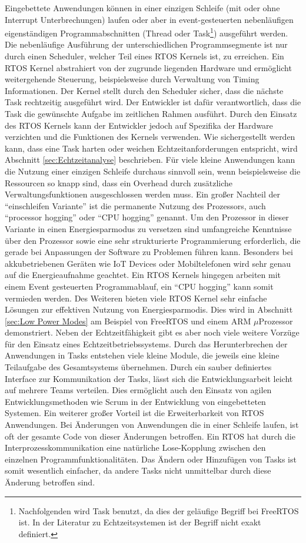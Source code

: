 Eingebettete Anwendungen können in einer einzigen Schleife (mit oder ohne Interrupt Unterbrechungen) laufen oder aber in event-gesteuerten ne\-ben\-läuf\-igen ei\-gen\-stän\-dig\-en Pro\-gramm\-ab\-schnit\-ten (Thre\-ad oder Task\footnote{Nachfolgenden wird Task benutzt, da dies der geläufige Begriff bei FreeRTOS ist. In der Literatur zu Echtzeitsystemen ist der Begriff nicht exakt definiert.}) ausgeführt werden. Die ne\-ben\-läuf\-ige Aus\-füh\-rung der unterschiedlichen Programmsegmente ist nur durch einen Scheduler, welcher Teil eines RTOS Kernels ist, zu erreichen. Ein RTOS Kernel abstrahiert von der zugrunde liegenden Hardware und ermöglicht weitergehende Steuerung, beispielsweise durch Verwaltung von Timing Informationen. Der Kernel stellt durch den Scheduler sicher, dass die näch\-ste Task rechtzeitig ausgeführt wird. Der Entwickler ist dafür verantwortlich, dass die Task die ge\-wün\-schte Aufgabe im zeitlichen Rahmen ausführt. Durch den Einsatz des RTOS Kernels kann der Entwickler jedoch auf Spezifika der Hardware verzichten und die Funktionen des Kernels verwenden. Wie sichergestellt werden kann, dass eine Task harten oder weichen Echtzeitanforderungen entspricht, wird Abschnitt \ref{sec:Echtzeitanalyse} beschrieben. Für viele kleine Anwendungen kann die Nutzung einer einzigen Schleife durchaus sinnvoll sein, wenn beispielsweise die Ressourcen so knapp sind, dass ein Overhead durch zusätzliche Verwaltungsfunktionen ausgeschlossen werden muss. Ein großer Nachteil der "`einschleifen Variante"' ist die permanente Nutzung des Prozessors, auch "`processor hogging"' oder "`CPU hogging"' genannt. Um den Prozessor in dieser Variante in einen Energiesparmodus zu versetzen sind umfangreiche Kenntnisse über den Prozessor sowie eine sehr strukturierte Programmierung erforderlich, die gerade bei Anpassungen der Software zu Problemen führen kann. Besonders bei akkubetriebenen Geräten wie IoT Devices oder Mobiltelefonen wird sehr genau auf die Energieaufnahme geachtet. Ein RTOS Kernels hingegen arbeiten mit einem Event gesteuerten Programmablauf, ein "`CPU hogging"' kann somit vermieden werden. Des Weiteren bieten viele RTOS Kernel sehr einfache Lösungen zur effektiven Nutzung von Energiesparmodis. Dies wird in Abschnitt \ref{sec:Low Power Modes} am Beispiel von FreeRTOS und einem ARM $\mu$Prozessor demonstriert. Neben der Echt\-zeit\-fähig\-keit gibt es aber noch viele weitere Vorzüge für den Einsatz eines Echtzeitbetriebssystems. Durch das Herunterbrechen der Anwendungen in Tasks entstehen viele kleine Module, die jeweils eine kleine Teilaufgabe des Gesamtsystems über\-neh\-men. Durch ein sauber definiertes Interface zur Kommunikation der Tasks, lässt sich die Entwicklungsarbeit leicht auf mehrere Teams verteilen. Dies ermöglicht auch den Einsatz von agilen Entwicklungsmethoden wie Scrum in der Entwicklung von eingebetteten Systemen. Ein weiterer großer Vorteil ist die Erweiterbarkeit von RTOS Anwendungen. Bei Änderungen von Anwendungen die in einer Schleife laufen, ist oft der gesamte Code von dieser Änderungen betroffen. Ein RTOS hat durch die Interprozesskommunikation eine natürliche Lose-Kopplung zwischen den einzelnen Programmfunktionalitäten. Das Än\-dern oder Hinzufügen von Tasks ist somit wesentlich einfacher, da andere Tasks nicht unmittelbar durch diese Än\-der\-ung betroffen sind. 




